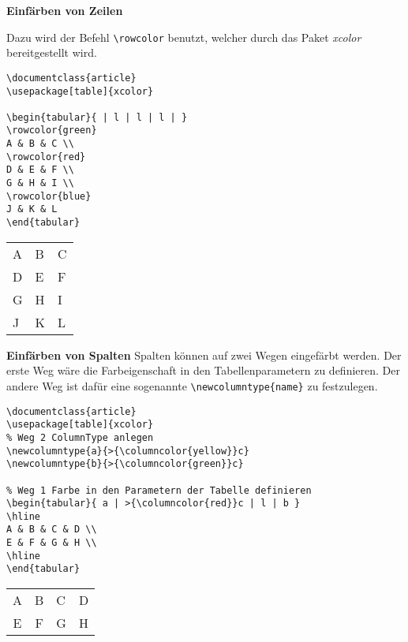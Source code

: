 \textbf{Einfärben von Zeilen}

Dazu wird der Befehl \verb|\rowcolor| benutzt, welcher durch das Paket \emph{xcolor} bereitgestellt wird.

\begin{lstlisting}[style=LaTeX,caption={Einfache Tabelle mit Einfärbung der Zeile},label=lst:tab6]
\documentclass{article}
\usepackage[table]{xcolor}

\begin{tabular}{ | l | l | l | }
\rowcolor{green}
A & B & C \\
\rowcolor{red}
D & E & F \\
G & H & I \\
\rowcolor{blue}
J & K & L
\end{tabular}

\end{lstlisting}


\begin{tabular}{ | l | l | l | }
	\rowcolor{green}
	A & B & C \\
	\rowcolor{red}
	D & E & F \\
	G & H & I \\
	\rowcolor{blue}
	J & K & L
\end{tabular}

\bigskip %

\textbf{Einfärben von Spalten}
Spalten können auf zwei Wegen eingefärbt werden. Der erste Weg wäre die Farbeigenschaft in den Tabellenparametern zu definieren. Der andere Weg ist dafür eine sogenannte \verb|\newcolumntype{name}| zu festzulegen.

\begin{lstlisting}[style=LaTeX,caption={Einfache Tabelle mit Einfärbung der Spalte},label=lst:tab7]
\documentclass{article}
\usepackage[table]{xcolor}
% Weg 2 ColumnType anlegen
\newcolumntype{a}{>{\columncolor{yellow}}c}
\newcolumntype{b}{>{\columncolor{green}}c}

% Weg 1 Farbe in den Parametern der Tabelle definieren
\begin{tabular}{ a | >{\columncolor{red}}c | l | b }
\hline
A & B & C & D \\
E & F & G & H \\
\hline
\end{tabular}

\end{lstlisting}
 
 
 \begin{tabular}{ a | >{}c | l | b }
 	\hline
 	A & B & C & D \\
 	E & F & G & H \\
 	\hline
 \end{tabular}

